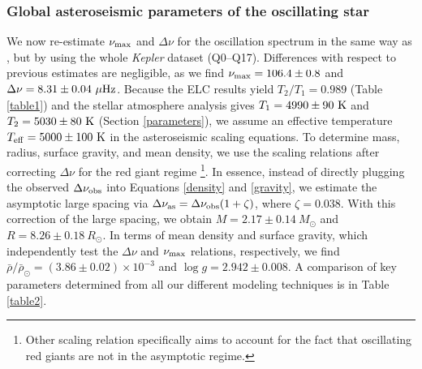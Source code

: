 \subsubsection{Global asteroseismic parameters of the oscillating star}
\label{subsubsec_main_osc}
We now re-estimate $\nu_{\rm{max}}$ and $\Delta \nu$ for the oscillation spectrum in the same way as \citet{gau14}, but by using the whole \textit{Kepler} dataset (Q0--Q17).  Differences with respect to previous estimates are negligible, as we find $\nu_{\rm{max}} = 106.4 \pm 0.8$ and $\Delta \nu = 8.31 \pm 0.04 \ \mu \rm{Hz}$. Because the ELC results yield $T_2/T_1=0.989$ (Table \ref{table1}) and the stellar atmosphere analysis gives $T_1 = 4990 \pm 90 \ \rm{K}$ and $T_2 = 5030 \pm 80 \ \rm{K}$ (Section \ref{parameters}), we assume an effective temperature $T_{\rm{eff}} = 5000 \pm 100 \ \rm{K}$ in the asteroseismic scaling equations. To determine mass, radius, surface gravity, and mean density, we use the scaling relations after correcting $\Delta \nu$ for the red giant regime \citep{mos13}\footnote{Other scaling relation  \citet{mos13} specifically aims to account for the fact that oscillating red giants are not in the asymptotic regime.}. In essence, instead of directly plugging the observed $\Delta \nu_{\rm{obs}}$ into Equations \ref{density} and \ref{gravity}, we estimate the asymptotic large spacing via $\Delta \nu_{\rm{as}} = \Delta \nu_{\rm{obs}} (1 + \zeta)$, where $\zeta = 0.038$. With this correction of the large spacing, we obtain $M = 2.17 \pm 0.14 \ M_{\odot}$ and $R = 8.26 \pm 0.18 \ R_{\odot}$. In terms of mean density and surface gravity, which independently test the $\Delta \nu$  and $\nu_{\rm{max}}$ relations, respectively, we find $\bar{\rho}/\bar{\rho}_{\odot} = (3.86 \pm 0.02) \times 10 ^{-3}$ and $\log g = 2.942 \pm 0.008$. A comparison of key parameters determined from all our different modeling techniques is in Table \ref{table2}.


  